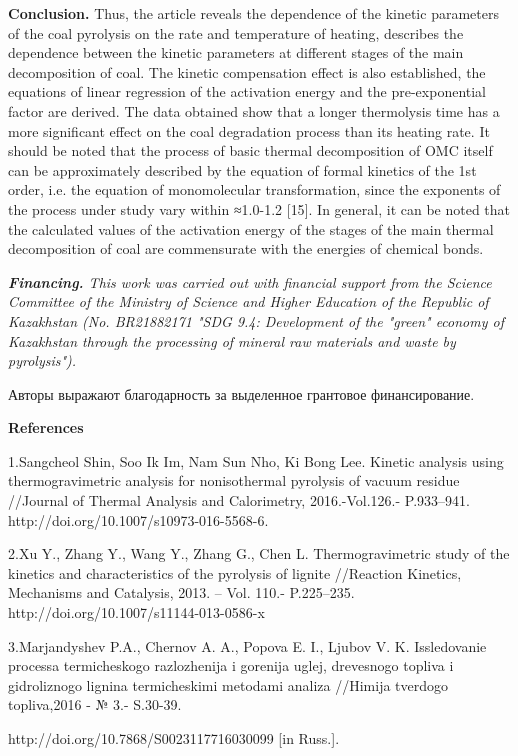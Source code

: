 \textbf{Conclusion.} Thus, the article reveals the dependence of the
kinetic parameters of the coal pyrolysis on the rate and temperature of
heating, describes the dependence between the kinetic parameters at
different stages of the main decomposition of coal. The kinetic
compensation effect is also established, the equations of linear
regression of the activation energy and the pre-exponential factor are
derived. The data obtained show that a longer thermolysis time has a
more significant effect on the coal degradation process than its heating
rate. It should be noted that the process of basic thermal decomposition
of OMC itself can be approximately described by the equation of formal
kinetics of the 1st order, i.e. the equation of monomolecular
transformation, since the exponents of the process under study vary
within ≈1.0-1.2 {[}15{]}. In general, it can be noted that the
calculated values of the activation energy of the stages of the main
thermal decomposition of coal are commensurate with the energies of
chemical bonds.

\emph{\textbf{Financing.} This work was carried out with financial
support from the Science Committee of the Ministry of Science and Higher
Education of the Republic of Kazakhstan (No. BR21882171 "SDG 9.4:
Development of the "green" economy of Kazakhstan through the processing
of mineral raw materials and waste by pyrolysis").}

Авторы выражают благодарность за выделенное грантовое финансирование.

\textbf{References}

1.Sangcheol Shin, Soo Ik Im, Nam Sun Nho, Ki Bong Lee. Kinetic analysis
using thermogravimetric analysis for nonisothermal pyrolysis of vacuum
residue //Journal of Thermal Analysis and Calorimetry, 2016.-Vol.126.-
P.933--941. http://doi.org/10.1007/s10973-016-5568-6.

2.Xu Y., Zhang Y., Wang Y., Zhang G., Chen L. Thermogravimetric study of
the kinetics and characteristics of the pyrolysis of lignite //Reaction
Kinetics, Mechanisms and Catalysis, 2013. -- Vol. 110.- P.225--235.
http://doi.org/10.1007/s11144-013-0586-x

3.Mar\textquotesingle jandyshev P.A., Chernov A. A., Popova E. I.,
Ljubov V. K. Issledovanie processa termicheskogo razlozhenija i gorenija
uglej, drevesnogo topliva i gidroliznogo lignina termicheskimi metodami
analiza //Himija tverdogo topliva,2016 - № 3.- S.30-39.

http://doi.org/10.7868/S0023117716030099 {[}in Russ.{]}.

